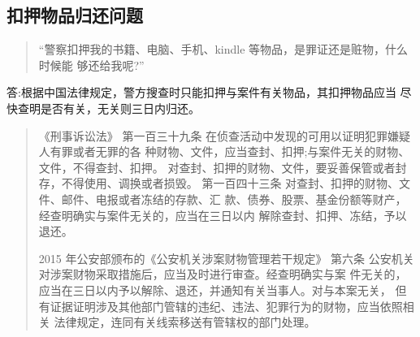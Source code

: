 \documentclass{ctexart}
\begin{document}
\subsection{扣押物品归还问题}
\begin{quotation}
  “警察扣押我的书籍、电脑、手机、kindle 等物品，是罪证还是赃物，什么时候能
够还给我呢?”
\end{quotation}\par
答:根据中国法律规定，警方搜查时只能扣押与案件有关物品，其扣押物品应当
尽快查明是否有关，无关则三日内归还。
\begin{quotation}
 《刑事诉讼法》
第一百三十九条 在侦查活动中发现的可用以证明犯罪嫌疑人有罪或者无罪的各
种财物、文件，应当查封、扣押;与案件无关的财物、文件，不得查封、扣押。 对查封、扣押的财物、文件，要妥善保管或者封存，不得使用、调换或者损毁。 第一百四十三条 对查封、扣押的财物、文件、邮件、电报或者冻结的存款、汇 款、债券、股票、基金份额等财产，经查明确实与案件无关的，应当在三日以内 解除查封、扣押、冻结，予以退还。\par
2015 年公安部颁布的《公安机关涉案财物管理若干规定》
第六条 公安机关对涉案财物采取措施后，应当及时进行审查。经查明确实与案 件无关的，应当在三日以内予以解除、退还，并通知有关当事人。对与本案无关， 但有证据证明涉及其他部门管辖的违纪、违法、犯罪行为的财物，应当依照相关 法律规定，连同有关线索移送有管辖权的部门处理。
\end{quotation}\par
\end{document}
